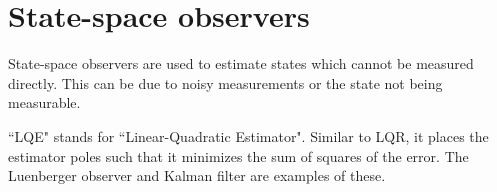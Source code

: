 
\chapter{State-space observers}

State-space observers are used to estimate \glspl{state} which cannot be
measured directly. This can be due to noisy measurements or the state not being
measurable.

``LQE" stands for ``Linear-Quadratic Estimator". Similar to LQR, it places the
estimator poles such that it minimizes the sum of squares of the error. The
Luenberger observer and Kalman filter are examples of these.








